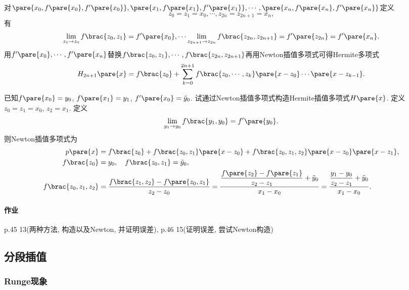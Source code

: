 \documentclass[hidelinks]{ctexart}
\begin{document}
对$\pare{x_0,f\pare{x_0},f'\pare{x_0}}, \pare{x_1,f\pare{x_1},f'\pare{x_1}},\cdots, \pare{x_n, f\pare{x_n}, f'\pare{x_n}}$定义
\[ z_0 = z_1 = x_0,\cdots,z_{2n} = z_{2n+1} = x_n, \]
有
\[ \lim_{z_1\rightarrow z_0} f\brac{z_0,z_1} = f'\pare{x_0},\cdots \lim_{z_{2n+1}\rightarrow z_{2n}}f\brac{z_{2n},z_{2n+1}} = f'\pare{z_{2n}} = f'\pare{x_n}. \]
用$f'\pare{x_0},\cdots,f'\pare{x_n}$替换$f\brac{z_0,z_1},\cdots,f\brac{z_{2n},z_{2n+1}}$再用Newton插值多项式可得Hermite多项式
\[ H_{2n+1}\pare{x} = f\brac{z_0} + \sum_{k=0}^{2n+1} f\brac{z_0,\cdots,z_k}\pare{x-z_0}\cdots \pare{x-z_{k-1}}. \]
\begin{ex}
    已知$f\pare{x_0} = y_0$, $f\pare{x_1} = y_1$, $f'\pare{x_0} = \tilde{y}_0$. 试通过Newton插值多项式构造Hermite插值多项式$H\pare{x}$. 定义$z_0 = z_1 = x_0$, $z_2 = x_1$. 定义
    \[ \lim_{y_1\rightarrow y_0} f\brac{y_1,y_0} = f'\pare{y_0}. \]
    则Newton插值多项式为
    \begin{align*}
        p\pare{x} &= f\brac{z_0} + f\brac{z_0,z_1}\pare{x-z_0} + f\brac{z_0,z_1,z_2}\pare{x-z_0}\pare{x-z_1},\\
        f\brac{z_0} &= y_0,\quad f\brac{z_0,z_1} = \tilde{y}_0,\\
        f\brac{z_0,z_1,z_2} &= \frac{f\brac{z_1,z_2} - f\pare{z_0,z_1}}{z_2 - z_0} = \frac{\displaystyle \frac{f\pare{z_2} - f\pare{z_1}}{z_2 - z_1} + \tilde{y}_0}{x_1 - x_0} = \frac{\displaystyle \frac{y_1 - y_0}{z_2 - z_1} + \tilde{y}_0}{x_1 - x_0}.
    \end{align*}
\end{ex}

\paragraph{作业} %
\label{par:作业}

p.45 13(两种方法, 构造以及Newton, 并证明误差), p.46 15(证明误差, 尝试Newton构造)



\subsection{分段插值} %
\label{sub:分段插值}

\subsubsection{Runge现象} %
\label{ssub:runge现象}
\end{document}
